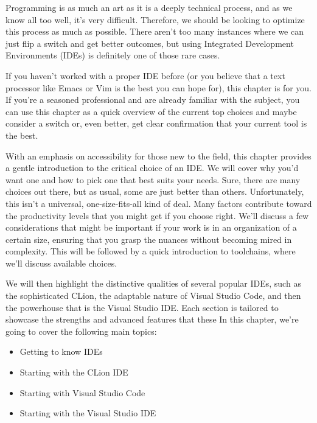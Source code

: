 Programming is as much an art as it is a deeply technical process, and as we know all too well, it’s very difficult. Therefore, we should be looking to optimize this process as much as possible. There aren’t too many instances where we can just flip a switch and get better outcomes, but using Integrated Development Environments (IDEs) is definitely one of those rare cases.

If you haven’t worked with a proper IDE before (or you believe that a text processor like Emacs or Vim is the best you can hope for), this chapter is for you. If you’re a seasoned professional and are already familiar with the subject, you can use this chapter as a quick overview of the current top choices and maybe consider a switch or, even better, get clear confirmation that your current tool is the best.

With an emphasis on accessibility for those new to the field, this chapter provides a gentle introduction to the critical choice of an IDE. We will cover why you’d want one and how to pick one that best suits your needs. Sure, there are many choices out there, but as usual, some are just better than others. Unfortunately, this isn’t a universal, one-size-fits-all kind of deal. Many factors contribute toward the productivity levels that you might get if you choose right. We’ll discuss a few considerations that might be important if your work is in an organization of a certain size, ensuring that you grasp the nuances without becoming mired in complexity. This will be followed by a quick introduction to toolchains, where we’ll discuss available choices.

We will then highlight the distinctive qualities of several popular IDEs, such as the sophisticated CLion, the adaptable nature of Visual Studio Code, and then the powerhouse that is the Visual Studio IDE. Each section is tailored to showcase the strengths and advanced features that these In this chapter, we’re going to cover the following main topics:

\begin{itemize}
\item
Getting to know IDEs

\item
Starting with the CLion IDE

\item
Starting with Visual Studio Code

\item
Starting with the Visual Studio IDE
\end{itemize}




